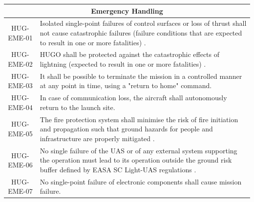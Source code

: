 \begin{longtable}{|c|p{13.5cm}|}
\multicolumn{2}{|c|}{\textbf{Emergency Handling}} \\\hline
HUG-EME-01 & Isolated single-point failures of control surfaces or loss of thrust shall not cause catastrophic failures (failure conditions that are expected to result in one or more fatalities) \cite{easa_light_uas_crd_is3}.\\\hline
HUG-EME-02 & HUGO shall be protected against the catastrophic effects of lightning (expected to result in one or more fatalities) \cite{easa_light_uas_crd_is3}. \\\hline
HUG-EME-03 & It shall be possible to terminate the mission in a controlled manner at any point in time, using a "return to home" command. \\\hline
HUG-EME-04 & In case of communication loss, the aircraft shall autonomously return to the launch site. \\\hline
HUG-EME-05 & The fire protection system shall minimise the risk of fire initiation and propagation such that ground hazards for people and infrastructure are properly mitigated \cite{easa_light_uas_crd_is3}. \\\hline
HUG-EME-06 & No single failure of the UAS or of any external system supporting the operation must lead to its operation outside the ground risk buffer defined by EASA SC Light-UAS regulations \cite{easa_light_uas_crd_is3}. \\\hline
HUG-EME-07 & No single-point failure of electronic components shall cause mission failure. \\\hline


\end{longtable}


